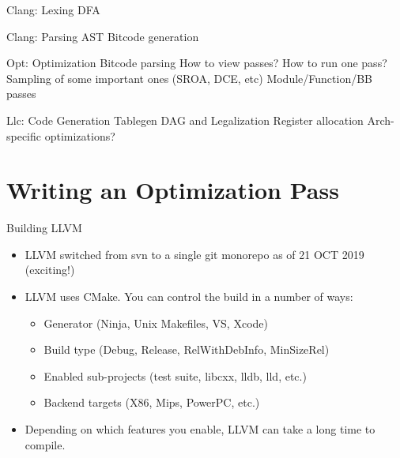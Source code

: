 \documentclass{beamer}
\begin{document}
\begin{frame}{Clang: Lexing}
DFA
\end{frame}


\begin{frame}{Clang: Parsing}
AST
Bitcode generation
\end{frame}


\begin{frame}{Opt: Optimization}
Bitcode parsing
How to view passes?
How to run one pass?
Sampling of some important ones (SROA, DCE, etc)
Module/Function/BB passes
\end{frame}


\begin{frame}{Llc: Code Generation}
Tablegen
DAG and Legalization
Register allocation
Arch-specific optimizations?
\end{frame}


\section{Writing an Optimization Pass}


\begin{frame}{Building LLVM}
    \begin{itemize}
        \item LLVM switched from svn to a single git monorepo as of 21 OCT 2019 (exciting!)
        \item LLVM uses CMake. You can control the build in a number of ways:
        \begin{itemize}
            \item Generator (Ninja, Unix Makefiles, VS, Xcode)
            \item Build type (Debug, Release, RelWithDebInfo, MinSizeRel)
            \item Enabled sub-projects (test suite, libcxx, lldb, lld, etc.)
            \item Backend targets (X86, Mips, PowerPC, etc.)
        \end{itemize}
        \item Depending on which features you enable, LLVM can take a long time to compile.
    \end{itemize}
\end{frame}
\end{document}
